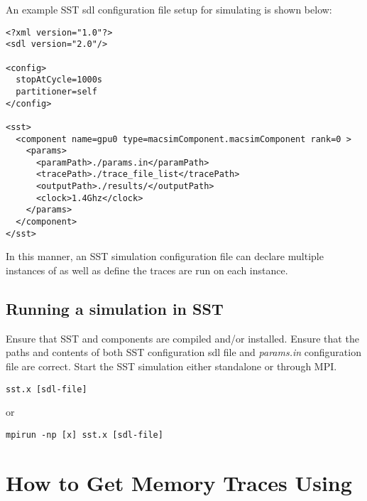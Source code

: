 An example SST sdl configuration file setup for simulating \SIM is shown below:

\begin{Verbatim}
<?xml version="1.0"?>
<sdl version="2.0"/>

<config>
  stopAtCycle=1000s
  partitioner=self
</config>

<sst>
  <component name=gpu0 type=macsimComponent.macsimComponent rank=0 >
    <params>
      <paramPath>./params.in</paramPath>
      <tracePath>./trace_file_list</tracePath>
      <outputPath>./results/</outputPath>
      <clock>1.4Ghz</clock>
    </params>
  </component>
</sst>
\end{Verbatim}

In this manner, an SST simulation configuration file can declare multiple
instances of \SIM as well as define the traces are run on each \SIM instance.

\subsection{Running a \SIM simulation in SST}

Ensure that SST and \SIM components are compiled and/or installed.  
Ensure that the paths and contents of both SST configuration sdl file and
\SIM \textit{params.in} configuration file are correct. Start the SST simulation 
either standalone or through MPI.

\begin{Verbatim}
sst.x [sdl-file]
\end{Verbatim}
or
\begin{Verbatim}
mpirun -np [x] sst.x [sdl-file]
\end{Verbatim}



\section{How to Get Memory Traces Using \SIM}











